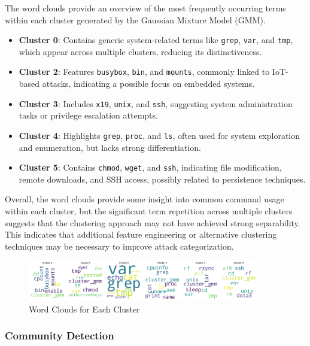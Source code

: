         The word clouds provide an overview of the most frequently occurring terms within each cluster generated by the Gaussian Mixture Model (GMM).

        \begin{itemize}
            \item \textbf{Cluster 0}: Contains generic system-related terms like \texttt{grep}, \texttt{var}, and \texttt{tmp}, which appear across multiple clusters, reducing its distinctiveness.
            \item \textbf{Cluster 2}: Features \texttt{busybox}, \texttt{bin}, and \texttt{mounts}, commonly linked to IoT-based attacks, indicating a possible focus on embedded systems.
            \item \textbf{Cluster 3}: Includes \texttt{x19}, \texttt{unix}, and \texttt{ssh}, suggesting system administration tasks or privilege escalation attempts.
            \item \textbf{Cluster 4}: Highlights \texttt{grep}, \texttt{proc}, and \texttt{ls}, often used for system exploration and enumeration, but lacks strong differentiation.
            \item \textbf{Cluster 5}: Contains \texttt{chmod}, \texttt{wget}, and \texttt{ssh}, indicating file modification, remote downloads, and SSH access, possibly related to persistence techniques.
        \end{itemize}

        Overall, the word clouds provide some insight into common command usage within each cluster, but the significant term repetition across multiple clusters suggests that the clustering approach may not have achieved strong separability. This indicates that additional feature engineering or alternative clustering techniques may be necessary to improve attack categorization. 

            \begin{figure}[H]
                \centering
                \includegraphics[width=0.9\textwidth]{../figures/plots/section3/circular_wordclouds.png}
                \caption{Word Clouds for Each Cluster}
                \label{fig:word_clouds}
            \end{figure}
            
            \subsubsection{Community Detection \\}
            
